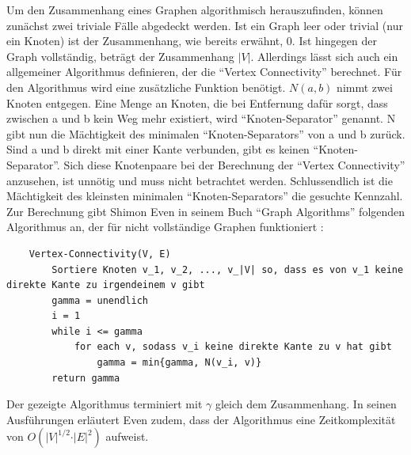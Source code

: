 \documentclass[a4paper,12pt,ngerman,chapterprefix=false,listof=totoc,bibliography=totoc]{scrreprt}
\begin{document}
{Um den Zusammenhang eines Graphen algorithmisch herauszufinden, können zunächst zwei triviale Fälle abgedeckt werden. Ist ein Graph leer oder trivial (nur ein Knoten) ist der Zusammenhang, wie bereits erwähnt, 0. Ist hingegen der Graph vollständig, beträgt der Zusammenhang \(\vert V\vert\). Allerdings lässt sich auch ein allgemeiner Algorithmus definieren, der die "`Vertex Connectivity"' berechnet.  Für den Algorithmus wird eine zusätzliche Funktion benötigt. \(N(a,b)\) nimmt zwei Knoten entgegen. Eine Menge an Knoten, die bei Entfernung dafür sorgt, dass zwischen a und b kein Weg mehr existiert, wird "`Knoten-Separator"' genannt. N gibt nun die Mächtigkeit des minimalen "`Knoten-Separators"' von a und b zurück. Sind a und b direkt mit einer Kante verbunden, gibt es keinen "`Knoten-Separator"'. Sich diese Knotenpaare bei der Berechnung der "`Vertex Connectivity"' anzusehen, ist unnötig und muss nicht betrachtet werden. Schlussendlich ist die Mächtigkeit des kleinsten minimalen "`Knoten-Separators"' die gesuchte Kennzahl. Zur Berechnung gibt Shimon Even in seinem Buch "`Graph Algorithms"' folgenden Algorithmus an, der für nicht vollständige Graphen funktioniert \cite{even_graph_2012}:
\begin{lstlisting}
	Vertex-Connectivity(V, E)
		Sortiere Knoten v_1, v_2, ..., v_|V| so, dass es von v_1 keine direkte Kante zu irgendeinem v gibt
		gamma = unendlich
		i = 1
		while i <= gamma
			for each v, sodass v_i keine direkte Kante zu v hat gibt
				gamma = min{gamma, N(v_i, v)}
		return gamma
\end{lstlisting}
Der gezeigte Algorithmus terminiert mit \(\gamma\) gleich dem Zusammenhang. In seinen Ausführungen erläutert Even zudem, dass der Algorithmus eine Zeitkomplexität von \(O(\vert V\vert^{1/2} \cdot \vert E\vert^2)\) aufweist.
}
\end{document}
